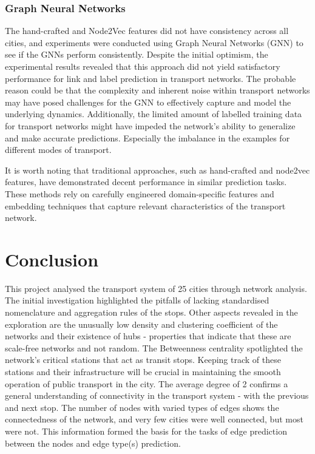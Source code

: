 \documentclass{article}
\theoremstyle{plain}
\theoremstyle{definition}
\theoremstyle{remark}
\begin{document}
\subsubsection{Graph Neural Networks}
The hand-crafted and Node2Vec features did not have consistency across all cities, and experiments were conducted using Graph Neural Networks (GNN) to see if the GNNs perform consistently. Despite the initial optimism, the experimental results revealed that this approach did not yield satisfactory performance for link and label prediction in transport networks. The probable reason could be that the complexity and inherent noise within transport networks may have posed challenges for the GNN to effectively capture and model the underlying dynamics. Additionally, the limited amount of labelled training data for transport networks might have impeded the network's ability to generalize and make accurate predictions. Especially the imbalance in the examples for different modes of transport.

It is worth noting that traditional approaches, such as hand-crafted and node2vec features, have demonstrated decent performance in similar prediction tasks. These methods rely on carefully engineered domain-specific features and embedding techniques that capture relevant characteristics of the transport network.

\section{Conclusion}
\label{conclusion}

This project analysed the transport system of 25 cities through network analysis. The initial investigation highlighted the pitfalls of lacking standardised nomenclature and aggregation rules of the stops. Other aspects revealed in the exploration are the unusually low density and clustering coefficient of the networks and their existence of hubs - properties that indicate that these are scale-free networks and not random. The Betweenness centrality spotlighted the network's critical stations that act as transit stops. Keeping track of these stations and their infrastructure will be crucial in maintaining the smooth operation of public transport in the city. The average degree of 2 confirms a general understanding of connectivity in the transport system - with the previous and next stop. The number of nodes with varied types of edges shows the connectedness of the network, and very few cities were well connected, but most were not. This information formed the basis for the tasks of edge prediction between the nodes and edge type(s) prediction.
\end{document}
